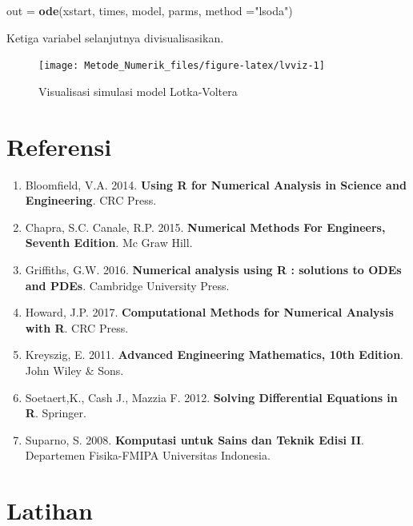\documentclass[]{book}
\newenvironment{Shaded}{\begin{snugshade}}{\end{snugshade}}
\newcommand{\DataTypeTok}[1]{\textcolor[rgb]{0.13,0.29,0.53}{#1}}
\newcommand{\KeywordTok}[1]{\textcolor[rgb]{0.13,0.29,0.53}{\textbf{#1}}}
\newcommand{\NormalTok}[1]{#1}
\newcommand{\StringTok}[1]{\textcolor[rgb]{0.31,0.60,0.02}{#1}}
\providecommand{\tightlist}{%
  \setlength{\itemsep}{0pt}\setlength{\parskip}{0pt}}
\theoremstyle{definition}
\theoremstyle{definition}
\theoremstyle{definition}
\theoremstyle{remark}
\begin{document}
\begin{Shaded}
\begin{Highlighting}[]
\NormalTok{out =}\StringTok{ }\KeywordTok{ode}\NormalTok{(xstart, times, model, parms, }
          \DataTypeTok{method =}\StringTok{"lsoda"}\NormalTok{)}
\end{Highlighting}
\end{Shaded}

Ketiga variabel selanjutnya divisualisasikan.

\begin{figure}

{\centering \texttt{[image: Metode\_Numerik\_files/figure-latex/lvviz-1]} 

}

\caption{Visualisasi simulasi model Lotka-Voltera}\label{fig:lvviz}
\end{figure}

\hypertarget{referensi-9}{%
\section{Referensi}\label{referensi-9}}

\begin{enumerate}
\def\labelenumi{\arabic{enumi}.}
\tightlist
\item
  Bloomfield, V.A. 2014. \textbf{Using R for Numerical Analysis in Science and Engineering}. CRC Press.
\item
  Chapra, S.C. Canale, R.P. 2015. \textbf{Numerical Methods For Engineers, Seventh Edition}. Mc Graw Hill.
\item
  Griffiths, G.W. 2016. \textbf{Numerical analysis using R : solutions to ODEs and PDEs}. Cambridge University Press.
\item
  Howard, J.P. 2017. \textbf{Computational Methods for Numerical Analysis with R}. CRC Press.
\item
  Kreyszig, E. 2011. \textbf{Advanced Engineering Mathematics, 10th Edition}. John Wiley \& Sons.
\item
  Soetaert,K., Cash J., Mazzia F. 2012. \textbf{Solving Differential Equations in R}. Springer.
\item
  Suparno, S. 2008. \textbf{Komputasi untuk Sains dan Teknik Edisi II}. Departemen Fisika-FMIPA Universitas Indonesia.
\end{enumerate}

\hypertarget{latihan-4}{%
\section{Latihan}\label{latihan-4}}
\end{document}
